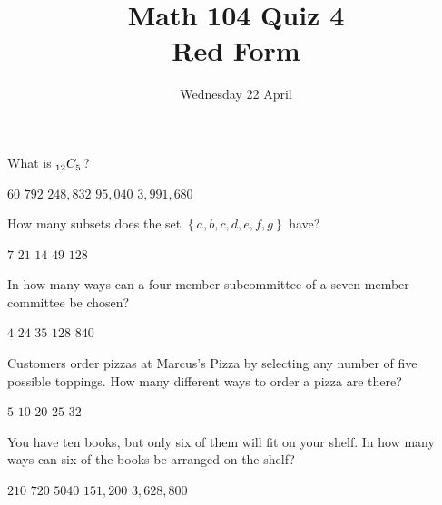 \documentclass[answers,12pt]{exam}
\title{Math 104 Quiz 4\\Red Form}
\date{Wednesday 22 April}
\newcommand\ncr[2]{\tensor[_{#1}]C{_{#2}}}
\begin{document}
\maketitle
\thispagestyle{empty}
\begin{center}
\end{center}

\begin{questions}

\question What is $\ncr{12}{5}$?\\
\begin{oneparchoices}
\choice $60$ %
\correctchoice $792$
\choice $248,832$ %
\choice $95,040$ %
\choice $3,991,680$ %
\end{oneparchoices}

\question How many subsets does the set
$\left\{a,b,c,d,e,f,g\right\}$ have?\\
\begin{oneparchoices}
\choice $7$ %
\choice $21$ %
\choice $14$ %
\choice $49$ %
\correctchoice $128$
\end{oneparchoices}

\question In how many ways can a four-member subcommittee
of a seven-member committee be chosen?\\
\begin{oneparchoices}
\choice $4$ %
\choice $24$ %
\correctchoice $35$
\choice $128$ %
\choice $840$ %
\end{oneparchoices}

\question Customers order pizzas at Marcus's Pizza
by selecting any number of five possible toppings.
How many different ways to order a pizza are there?\\
\begin{oneparchoices}
\choice $5$ %
\choice $10$ %
\choice $20$ %
\choice $25$ %
\correctchoice $32$
\end{oneparchoices}

\question You have ten books, but only six
of them will fit on your shelf. In how many 
ways can six of the books be arranged on the shelf?\\
\begin{oneparchoices}
\choice $210$ %
\choice $720$ %
\choice $5040$ %
\correctchoice $151,200$
\choice $3,628,800$ %
\end{oneparchoices}


\end{questions}
\end{document}
